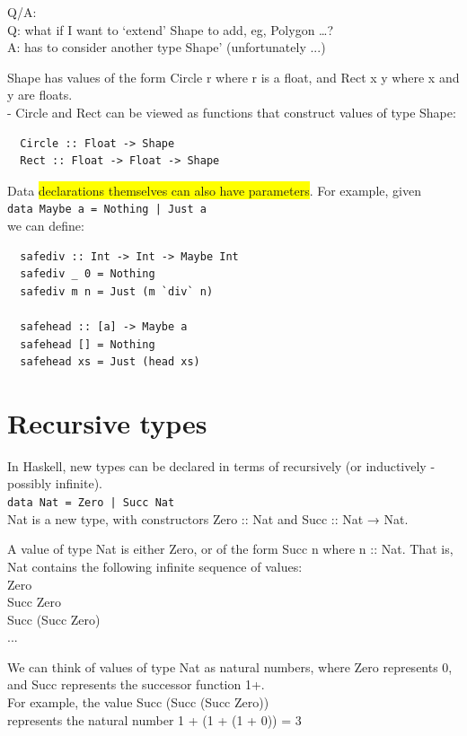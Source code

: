\documentclass[tikz,border=10pt]{project_plan}
\begin{document}
Q/A:\\
Q: what if I want to `extend’ Shape to add, eg, Polygon …?\\
A: has to consider another type Shape’ (unfortunately ...)

Shape has values of the form Circle r where r is a float,
and Rect x y where x and y are floats.\\
- Circle and Rect can be viewed as functions that
construct values of type Shape:
\begin{lstlisting}
  Circle :: Float -> Shape
  Rect :: Float -> Float -> Shape
\end{lstlisting}

Data \colorbox{yellow}{declarations themselves can also have parameters}.
For example, given\\
\lstinline?data Maybe a = Nothing | Just a?\\
we can define:\\
\begin{lstlisting}
  safediv :: Int -> Int -> Maybe Int
  safediv _ 0 = Nothing
  safediv m n = Just (m `div` n)

  safehead :: [a] -> Maybe a
  safehead [] = Nothing
  safehead xs = Just (head xs)
\end{lstlisting}

\section{Recursive types}

In Haskell, new types can be declared in terms of
recursively (or inductively - possibly infinite).\\
\lstinline?data Nat = Zero | Succ Nat?\\
Nat is a new type, with constructors
Zero :: Nat and Succ :: Nat → Nat.

A value of type Nat is either Zero, or of the form Succ n
where n :: Nat. That is, Nat contains the following
infinite sequence of values:\\
Zero\\
Succ Zero\\
Succ (Succ Zero)\\
...

We can think of values of type Nat as natural numbers,
where Zero represents 0, and Succ represents the
successor function 1+.\\
For example, the value Succ (Succ (Succ Zero))\\
represents the natural number 1 + (1 + (1 + 0)) = 3
\end{document}

